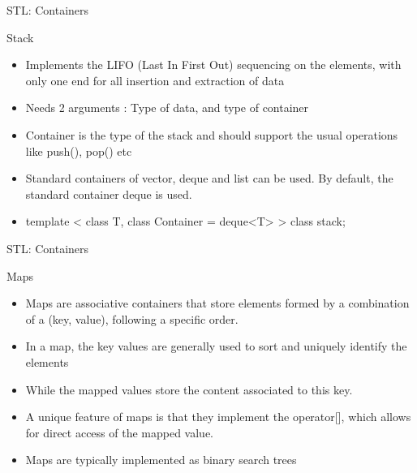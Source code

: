 \documentclass{beamer}
\begin{document}
\begin{frame}[fragile]{STL: Containers}
  \begin{block}{Stack}
    \begin{itemize}
    \item Implements the LIFO (Last In First Out) sequencing on the elements, with only one end for all insertion and extraction of data\pause
    \item Needs 2 arguments : Type of data, and type of container\pause
    \item Container is the type of the stack and should support the usual operations like push(), pop() etc\pause
    \item Standard containers of vector, deque and list can be used. By default, the standard container deque is used.\pause
    \item template < class T, class Container = deque<T> > class stack;
    \end{itemize}
  \end{block}
\end{frame}

\begin{frame}[fragile]{STL: Containers}
  \begin{block}{Maps}
    \begin{itemize}
    \item Maps are associative containers that store elements formed by a combination of a (key, value), following a specific order.\pause
    \item In a map, the key values are generally used to sort and uniquely identify the elements\pause
    \item While the mapped values store the content associated to this key.\pause
    \item A unique feature of maps is that they implement the operator[], which allows for direct access of the mapped value.\pause
    \item Maps are typically implemented as binary search trees
    \end{itemize}
  \end{block}
\end{frame}
\end{document}
